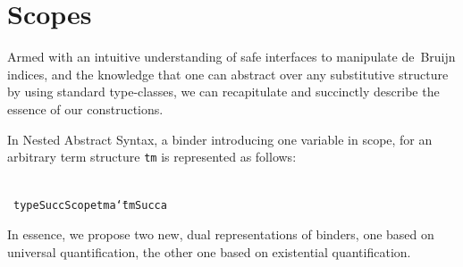 \documentclass[9pt,authoryear]{sigplanconf}
\begin{document}
\section{Scopes\label{scopesSec}}

%
Armed with an intuitive understanding of safe interfaces to
    manipulate de{~}Bruijn indices, and the knowledge that one can
    abstract over any substitutive structure by using standard
    type-classes, we can recapitulate and succinctly describe the
    essence of our constructions.%


%
In Nested Abstract Syntax, a binder introducing one variable in
    scope, for an arbitrary term structure \texttt{tm} is represented as
    follows{:}%


{\nopagebreak }

%
%
%
~\\~\vphantom{$\{$}\texttt{type}\texttt{\mbox{\hspace{0.50em}}}\texttt{SuccScope}\texttt{\mbox{\hspace{0.50em}}}\texttt{tm}\texttt{\mbox{\hspace{0.50em}}}\texttt{a}\texttt{\mbox{\hspace{0.50em}}}\texttt{{\char `\=}}\texttt{\mbox{\hspace{0.50em}}}\texttt{tm}\texttt{\mbox{\hspace{0.50em}}}\texttt{\makebox[1.22ex][l]{$ {(} $}}\texttt{Succ}\texttt{\mbox{\hspace{0.50em}}}\texttt{a}\texttt{\makebox[1.22ex][r]{$ {)} $}}\texttt{{\nopagebreak \newline%
}\vphantom{$\{$}}%


%
In essence, we propose two new, dual representations of binders,
    one based on universal quantification, the other one based on
    existential quantification.%


%
%


{\nopagebreak }
\end{document}
